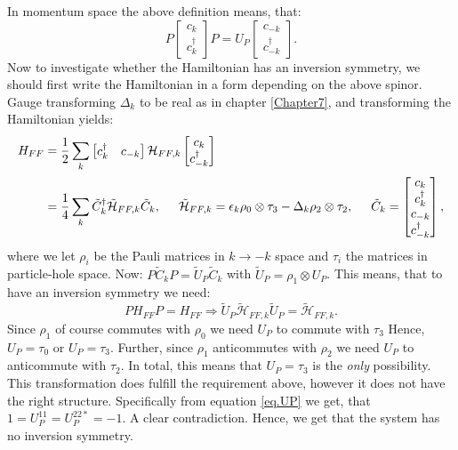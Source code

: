 In momentum space the above definition means, that:
\begin{equation}
P\begin{bmatrix} c_k \\ c^\dagger_k \end{bmatrix} P = U_P\begin{bmatrix} c_{-k} \\ c^\dagger_{-k} \end{bmatrix}.
\end{equation}
Now to investigate whether the Hamiltonian has an inversion symmetry, we should first write the Hamiltonian in a form depending on the above spinor. Gauge transforming $\Delta_k$ to be real as in chapter \ref{Chapter7}, and transforming the Hamiltonian yields:
\begin{align}
H_{FF} &= \frac{1}{2}\sum_k \begin{bmatrix} c_k^\dagger & c_{-k}\end{bmatrix}\mathcal{H}_{FF,k} \begin{bmatrix} c_k \\ c^\dagger_{-k}\end{bmatrix} \nonumber \\
	   &= \frac{1}{4}\sum_k \tilde{C}^\dagger_k \tilde{\mathcal{H}}_{FF,k} \tilde{C}_k, \hspace{0.5cm} \tilde{\mathcal{H}}_{FF,k} = \epsilon_k \rho_0 \otimes \tau_3 - \Delta_k \rho_2 \otimes \tau_2, \hspace{0.5cm} \tilde{C}_k = \begin{bmatrix} c_k \\ c^\dagger_{k} \\ c_{-k} \\ c^\dagger_{-k}\end{bmatrix}, 
\end{align}
where we let $\rho_i$ be the Pauli matrices in $k\to -k$ space and $\tau_i$ the matrices in particle-hole space. Now: $P\tilde{C}_kP = \tilde{U}_P \tilde{C}_k$ with $\tilde{U}_P = \rho_1\otimes U_P$. This means, that to have an inversion symmetry we need:
\begin{equation}
PH_{FF}P = H_{FF} \Rightarrow \tilde{U}_P\tilde{\mathcal{H}}_{FF,k}\tilde{U}_P = \tilde{\mathcal{H}}_{FF,k}. \nonumber 
\end{equation}
Since $\rho_1$ of course commutes with $\rho_0$ we need $U_P$ to commute with $\tau_3$ Hence, $U_P = \tau_0$ or $U_P = \tau_3$. Further, since $\rho_1$ anticommutes with $\rho_2$ we need $U_P$ to anticommute with $\tau_2$. In total, this means that $U_P = \tau_3$ is the \textit{only} possibility. This transformation does fulfill the requirement above, however it does not have the right structure. Specifically from equation \ref{eq.UP} we get, that $1 = U_P^{11} = U_P^{22*} = -1$. A clear contradiction. Hence, we get that the system has no inversion symmetry. 

